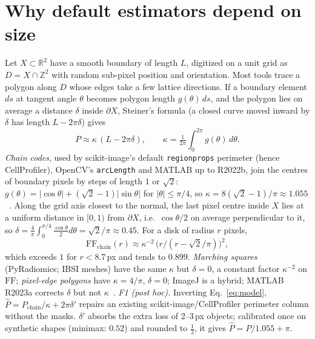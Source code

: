 \documentclass{article}
\newcommand{\ff}{\mathrm{FF}}
\begin{document}
\section{Why default estimators depend on size}
\label{sec:model}
Let $X\subset\mathbb{R}^2$ have a smooth boundary of length $L$, digitized on a unit grid as $D=X\cap\mathbb{Z}^2$ with random sub-pixel position and orientation. Most tools trace a polygon along $D$ whose edges take a few lattice directions. If a boundary element $ds$ at tangent angle $\theta$ becomes polygon length $g(\theta)\,ds$, and the polygon lies on average a distance $\delta$ inside $\partial X$, Steiner's formula (a closed curve moved inward by $\delta$ has length $L-2\pi\delta$) gives
\begin{equation}
P \approx \kappa\,(L-2\pi\delta),\qquad \kappa=\tfrac{1}{2\pi}\textstyle\int_0^{2\pi} g(\theta)\,d\theta .
\label{eq:model}
\end{equation}
\emph{Chain codes}, used by scikit-image's default \texttt{regionprops} perimeter (hence CellProfiler), OpenCV's \texttt{arcLength} and MATLAB up to R2022b, join the centres of boundary pixels by steps of length $1$ or $\sqrt2$: $g(\theta)=|\cos\theta|+(\sqrt2-1)|\sin\theta|$ for $|\theta|\le\pi/4$, so $\kappa=8(\sqrt2-1)/\pi\approx1.055$~\cite{kulpa1977}. Along the grid axis closest to the normal, the last pixel centre inside $X$ lies at a uniform distance in $[0,1)$ from $\partial X$, i.e.\ $\cos\theta/2$ on average perpendicular to it, so $\delta=\tfrac{4}{\pi}\int_0^{\pi/4}\tfrac{\cos\theta}{2}d\theta=\sqrt2/\pi\approx0.45$. For a disk of radius $r$ pixels,
\begin{equation}
\ff_{\text{chain}}(r)\approx \kappa^{-2}\,\big(r/(r-\sqrt2/\pi)\big)^{2},
\label{eq:disk}
\end{equation}
which exceeds $1$ for $r<8.7$\,px and tends to $0.899$. \emph{Marching squares} (PyRadiomics; IBSI meshes) have the same $\kappa$ but $\delta=0$, a constant factor $\kappa^{-2}$ on $\ff$; \emph{pixel-edge polygons} have $\kappa=4/\pi$, $\delta=0$; ImageJ is a hybrid; MATLAB R2023a corrects $\delta$ but not $\kappa$~\cite{matlab2023}.
\emph{F1 (post hoc).} Inverting Eq.~\eqref{eq:model}, $\hat P=P_{\text{chain}}/\kappa+2\pi\delta'$ repairs an existing scikit-image/CellProfiler perimeter column without the masks. $\delta'$ absorbs the extra loss of 2--3\,px objects; calibrated once on synthetic shapes (minimax: $0.52$) and rounded to $\tfrac12$, it gives $\hat P=P/1.055+\pi$.
\end{document}
